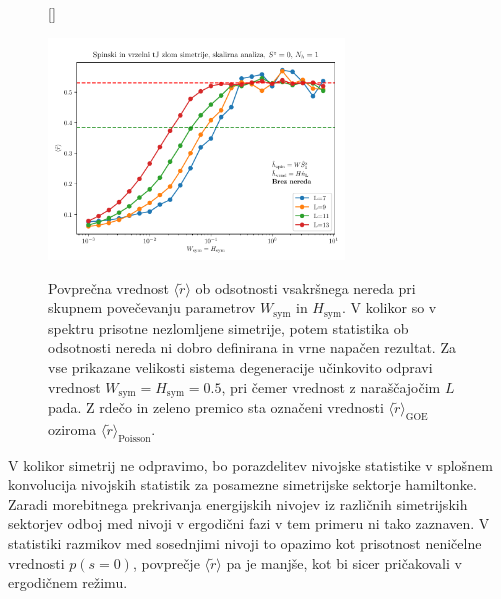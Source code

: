 \documentclass[10pt,a4paper]{article}
\begin{document}
\begin{figure}[H]
[\FBwidth]
{\caption{ Povprečna vrednost $\langle\tilde{r}\rangle$ ob odsotnosti vsakršnega nereda pri skupnem povečevanju parametrov $W_\mathrm{sym}$ in $H_\mathrm{sym}$. V kolikor so v spektru prisotne nezlomljene simetrije, potem statistika ob odsotnosti nereda ni dobro definirana in vrne napačen rezultat. Za vse prikazane velikosti sistema degeneracije učinkovito odpravi vrednost $W_\mathrm{sym}=H_\mathrm{sym}=0.5$, pri čemer vrednost z naraščajočim $L$ pada. Z rdečo in zeleno premico sta označeni vrednosti $\langle \tilde{r}\rangle_\mathrm{GOE}$ oziroma $\langle \tilde{r}\rangle_\mathrm{Poisson}$. }\label{fig:hole_spin_disorder_sym_break_13_1_6_slo}}
{\includegraphics[width=0.7\textwidth]{hole_spin_disorder_sym_break_13_1_6_slo.pdf}}
\end{figure}
V kolikor simetrij ne odpravimo, bo porazdelitev nivojske statistike v splošnem konvolucija nivojskih statistik za posamezne simetrijske sektorje hamiltonke. Zaradi morebitnega prekrivanja energijskih nivojev iz različnih simetrijskih sektorjev odboj med nivoji v ergodični fazi v tem primeru ni tako zaznaven. V statistiki razmikov med sosednjimi nivoji to opazimo kot prisotnost neničelne vrednosti $p(s=0)$, povprečje $\langle \tilde{r}\rangle$ pa je manjše, kot bi sicer pričakovali v ergodičnem režimu. 
\end{document}
